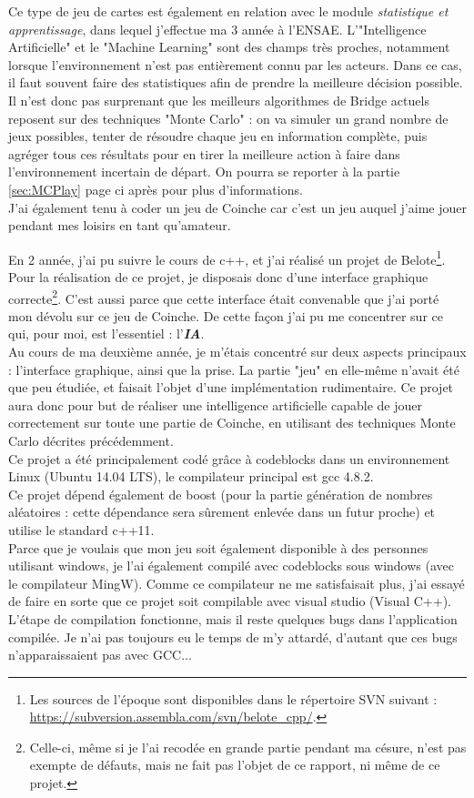 \documentclass[a4paper,11pt]{article}
\begin{document}
Ce type de jeu de cartes est également en relation avec le module \textit{statistique et apprentissage}, dans lequel j'effectue ma 3\ieme{} année à l'ENSAE. L'"Intelligence Artificielle" et le "Machine Learning" sont des champs très proches, notamment lorsque l'environnement n'est pas entièrement connu par les acteurs. Dans ce cas, il faut souvent faire des statistiques afin de prendre la meilleure décision possible. Il n'est donc pas surprenant que les meilleurs algorithmes de Bridge actuels reposent sur des techniques "Monte Carlo" : on va simuler un grand nombre de jeux possibles, tenter de résoudre chaque jeu en information complète, puis agréger tous ces résultats pour en tirer la meilleure action à faire dans l'environnement incertain de départ. On pourra se reporter à la partie \ref{sec:MCPlay} page \pageref{sec:MCPlay} ci après pour plus d'informations. \\
J'ai également tenu à coder un jeu de Coinche car c'est un jeu auquel j'aime jouer pendant mes loisirs en tant qu'amateur.

En 2\ieme{} année, j'ai pu suivre le cours de c++, et j'ai réalisé un projet de Belote\footnote{Les sources de l'époque sont disponibles dans le répertoire SVN suivant : \url{https://subversion.assembla.com/svn/belote_cpp/}.}. Pour la réalisation de ce projet, je disposais donc d'une interface graphique correcte\footnote{Celle-ci, même si je l'ai recodée en grande partie pendant ma césure, n'est pas exempte de défauts, mais ne fait pas l'objet de ce rapport, ni même de ce projet.}. C'est aussi parce que cette interface était convenable que j'ai porté mon dévolu sur ce jeu de Coinche. De cette façon j'ai pu me concentrer sur ce qui, pour moi, est l'essentiel : l'\textbf{\textit{IA}}. \\
Au cours de ma deuxième année, je m'étais concentré sur deux aspects principaux : l'interface graphique, ainsi que la prise. La partie "jeu" en elle-même n'avait été que peu étudiée, et faisait l'objet d'une implémentation rudimentaire. Ce projet aura donc pour but de réaliser une intelligence artificielle capable de jouer correctement sur toute une partie de Coinche, en utilisant des techniques Monte Carlo décrites précédemment. \\

Ce projet a été principalement codé grâce à codeblocks dans un environnement Linux (Ubuntu 14.04 LTS), le compilateur principal est gcc 4.8.2. \\
Ce projet dépend également de boost (pour la partie génération de nombres aléatoires : cette dépendance sera sûrement enlevée dans un futur proche) et utilise le standard c++11.\\
Parce que je voulais que mon jeu soit également disponible à des personnes utilisant windows, je l'ai également compilé avec codeblocks sous windows (avec le compilateur MingW). Comme ce compilateur ne me satisfaisait plus, j'ai essayé de faire en sorte que ce projet soit compilable avec visual studio (Visual C++). L'étape de compilation fonctionne, mais il reste quelques bugs dans l'application compilée. Je n'ai pas toujours eu le temps de m'y attardé, d'autant que ces bugs n'apparaissaient pas avec GCC...
\end{document}
